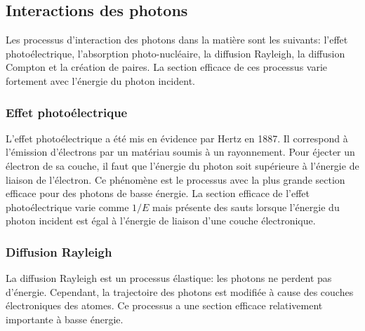 \newpage
\subsection{Interactions des photons}
\label{sec.photon_in_matter}
Les processus d'interaction des photons dans la matière sont les suivants: l'effet photoélectrique, l'absorption photo-nucléaire, la diffusion Rayleigh, la diffusion Compton et la création de paires. La section efficace de ces processus varie fortement avec l'énergie du photon incident. 
\subsubsection{Effet photoélectrique}
L'effet photoélectrique a été mis en évidence par Hertz en 1887. Il correspond à l'émission d'électrons par un matériau soumis à un rayonnement. Pour éjecter un électron de sa couche, il faut que l'énergie du photon soit supérieure à l'énergie de liaison de l'électron. Ce phénomène est le processus avec la plus grande section efficace pour des photons de basse énergie. La section efficace de l'effet photoélectrique varie comme $1/E$ mais présente des sauts lorsque l'énergie du photon incident est égal à l'énergie de liaison d'une couche électronique.
\subsubsection{Diffusion Rayleigh}
La diffusion Rayleigh est un processus élastique: les photons ne perdent pas d'énergie. Cependant, la trajectoire des photons est modifiée à cause des couches électroniques des atomes. Ce processus a une section efficace relativement importante à basse énergie.
